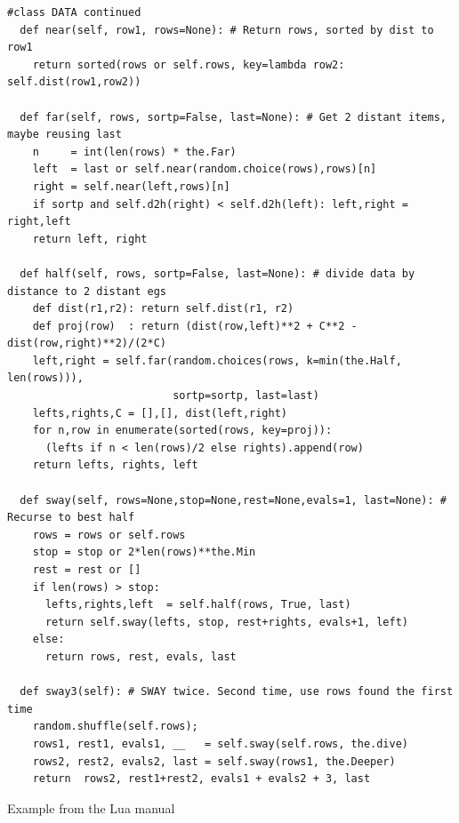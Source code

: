 \begin{listing}[!ht]
\begin{verbatim}
#class DATA continued
  def near(self, row1, rows=None): # Return rows, sorted by dist to row1
    return sorted(rows or self.rows, key=lambda row2: self.dist(row1,row2))
    
  def far(self, rows, sortp=False, last=None): # Get 2 distant items, maybe reusing last 
    n     = int(len(rows) * the.Far)
    left  = last or self.near(random.choice(rows),rows)[n]
    right = self.near(left,rows)[n]
    if sortp and self.d2h(right) < self.d2h(left): left,right = right,left
    return left, right

  def half(self, rows, sortp=False, last=None): # divide data by distance to 2 distant egs 
    def dist(r1,r2): return self.dist(r1, r2)
    def proj(row)  : return (dist(row,left)**2 + C**2 - dist(row,right)**2)/(2*C)
    left,right = self.far(random.choices(rows, k=min(the.Half, len(rows))),
                          sortp=sortp, last=last)
    lefts,rights,C = [],[], dist(left,right)
    for n,row in enumerate(sorted(rows, key=proj)):
      (lefts if n < len(rows)/2 else rights).append(row)
    return lefts, rights, left

  def sway(self, rows=None,stop=None,rest=None,evals=1, last=None): # Recurse to best half
    rows = rows or self.rows
    stop = stop or 2*len(rows)**the.Min
    rest = rest or []
    if len(rows) > stop:
      lefts,rights,left  = self.half(rows, True, last)
      return self.sway(lefts, stop, rest+rights, evals+1, left)
    else:
      return rows, rest, evals, last

  def sway3(self): # SWAY twice. Second time, use rows found the first time
    random.shuffle(self.rows);
    rows1, rest1, evals1, __   = self.sway(self.rows, the.dive)
    rows2, rest2, evals2, last = self.sway(rows1, the.Deeper)
    return  rows2, rest1+rest2, evals1 + evals2 + 3, last
\end{verbatim}
\caption{Example from the Lua manual}
\label{listing:3}
\end{listing}

